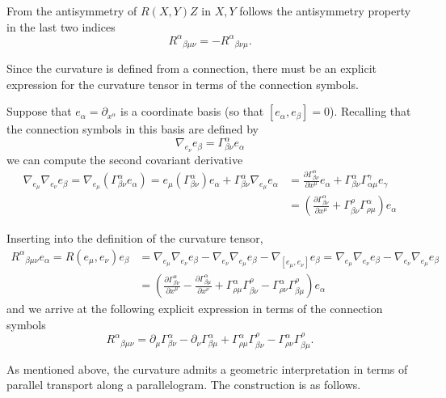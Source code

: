 \begin{points}
\item From the antisymmetry of $R(X,Y)Z$ in $X,Y$ follows the antisymmetry property in the last two indices
\[
  R^\alpha{}_{\beta\mu\nu}=-R^\alpha{}_{\beta\nu\mu} .
\]

\item Since the curvature is defined from a connection, there must be an explicit expression for the curvature tensor in terms of the connection symbols.

\item Suppose that $e_\alpha=\partial_{x^\alpha}$ is a coordinate basis (so that $[e_\alpha,e_\beta]=0$). Recalling that the connection symbols in this basis are defined by
\[
  \nabla_{e_\nu}e_\beta=\Gamma^\alpha_{\beta\nu}e_\alpha
\]
we can compute the second covariant derivative
\begin{align*}
  \nabla_{e_\mu}\nabla_{e_\nu}e_\beta=\nabla_{e_\mu}\left(\Gamma^\alpha_{\beta\nu}e_\alpha\right)=e_\mu\left(\Gamma^\alpha_{\beta\nu}\right)e_\alpha+\Gamma^\alpha_{\beta\nu}\nabla_{e_\mu}e_\alpha&=\frac{\partial\Gamma^\alpha_{\beta\nu}}{\partial x^\mu}e_\alpha+\Gamma^\alpha_{\beta\nu}\Gamma^\gamma_{\alpha\mu}e_\gamma\\
  &=\left(\frac{\partial\Gamma^\alpha_{\beta\nu}}{\partial x^\mu}+\Gamma^\rho_{\beta\nu}\Gamma^\alpha_{\rho\mu}\right)e_\alpha
\end{align*}

\item Inserting into the definition of the curvature tensor,
\begin{align*}
  R^\alpha{}_{\beta\mu\nu}e_\alpha=R(e_\mu,e_\nu)e_\beta&=\nabla_{e_\mu}\nabla_{e_\nu}e_\beta-\nabla_{e_\nu}\nabla_{e_\mu}e_\beta-\nabla_{[e_\mu,e_\nu]}e_\beta=\nabla_{e_\mu}\nabla_{e_\nu}e_\beta-\nabla_{e_\nu}\nabla_{e_\mu}e_\beta\\
  &=\left(\frac{\partial\Gamma^\alpha_{\beta\nu}}{\partial x^\mu}-\frac{\partial\Gamma^\alpha_{\beta\mu}}{\partial x^\nu}+\Gamma^\alpha_{\rho\mu}\Gamma^\rho_{\beta\nu}-\Gamma^\alpha_{\rho\nu}\Gamma^\rho_{\beta\mu}\right)e_\alpha
\end{align*}
and we arrive at the following explicit expression in terms of the connection symbols
\[
  R^\alpha{}_{\beta\mu\nu}=\partial_\mu\Gamma^\alpha_{\beta\nu}-\partial_\nu\Gamma^\alpha_{\beta\mu}+\Gamma^\alpha_{\rho\mu}\Gamma^\rho_{\beta\nu}-\Gamma^\alpha_{\rho\nu}\Gamma^\rho_{\beta\mu} .
\]

\item As mentioned above, the curvature admits a geometric interpretation in terms of parallel transport along a parallelogram. The construction is as follows.


\end{points}
